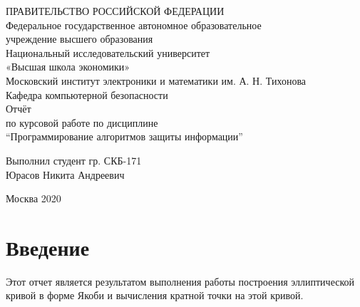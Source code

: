 \documentclass[a4paper,12pt]{article}
\begin{document}
	\begin{center}
		\hfill \break
		\normalsize{ПРАВИТЕЛЬСТВО РОССИЙСКОЙ ФЕДЕРАЦИИ}\\
		\normalsize{Федеральное государственное автономное образовательное}\\ 
		\normalsize{учреждение высшего образования}\\
		\hfill \break
		\normalsize{Национальный исследовательский университет}\\
		\normalsize{«Высшая школа экономики»}\\
		\hfill \break
		\normalsize{Московский институт электроники и математики им. А. Н. Тихонова}\\
		\hfill \break
		\normalsize{Кафедра компьютерной безопасности}\\
		\hfill\break
		\hfill \break
		\hfill \break
		\hfill \break
		\large{Отчёт \\по курсовой работе по дисциплине \\“Программирование алгоритмов защиты информации”}\\
		\hfill \break
		\hfill \break
		\hfill \break
	\end{center}
	\begin{flushright}
		Выполнил студент гр. СКБ-171\\
		Юрасов Никита Андреевич
	\end{flushright}
	\hfill \break
	\hfill \break
	\hfill \break
	\hfill \break
	\hfill \break
	\hfill \break
	\hfill \break
	\hfill \break
	\hfill \break
	\hfill \break
	\hfill \break
	\hfill \break
	\hfill \break
	\hfill \break
	\hfill \break
	\hfill \break
	\hfill \break
	\hfill \break
	\hfill \break
	\hfill \break
	\begin{center} Москва 2020 \end{center}
	\thispagestyle{empty} %
	
	\tableofcontents
	\newpage
	
	\section{Введение}
	Этот отчет является результатом выполнения работы построения эллиптической кривой в форме Якоби и вычисления кратной точки на этой кривой.\\
	
\end{document}

